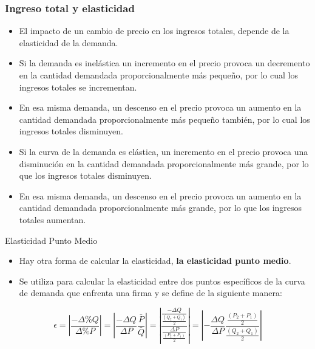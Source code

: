 \documentclass{beamer}
\begin{document}
\begin{frame}
\frametitle{Ingreso total y elasticidad}
\begin{itemize}
    \item El impacto de un cambio de precio en los ingresos totales, depende de la elasticidad de la demanda.
    \item Si la demanda es inelástica un incremento en el precio provoca un decremento en la cantidad demandada proporcionalmente más pequeño, por lo cual los ingresos totales se incrementan.
    \item En esa misma demanda, un descenso en el precio provoca un aumento en la cantidad demandada proporcionalmente más pequeño también, por lo cual los ingresos totales disminuyen.
    \item Si la curva de la demanda es elástica, un incremento en el precio provoca una disminución en la cantidad demandada proporcionalmente más grande, por lo que los ingresos totales disminuyen.
    \item En esa misma demanda, un descenso en el precio provoca un aumento en la cantidad demandada proporcionalmente más grande, por lo que los ingresos totales aumentan.
\end{itemize}
\end{frame}

\begin{frame}{Elasticidad Punto Medio}
  \begin{itemize}
      \item Hay otra forma de calcular la elasticidad, \textbf{la elasticidad punto medio}.
      \item Se utiliza para calcular la elasticidad entre dos puntos
      específicos de la curva de demanda que enfrenta una firma y se define
      de la siguiente manera:
    \end{itemize}
    \begin{equation*}
      \epsilon = \left|\frac{- \Delta \% Q}{\Delta \% P}\right|= \left|\frac{- \Delta Q}{\Delta P} \frac{\bar P}{\bar Q}\right| = \left|\frac{\frac{- \Delta Q}{\frac{(Q_2+Q_1)}{2}}}{\frac{\Delta P}{\frac{(P_2+P_1)}{2}}}\right| = \left|-\frac{\Delta Q}{\Delta P} \frac{\frac{(P_2+P_1)}{2}}{\frac{(Q_2+Q_1)}{2}}\right|
    \end{equation*}
\end{frame}
\end{document}
